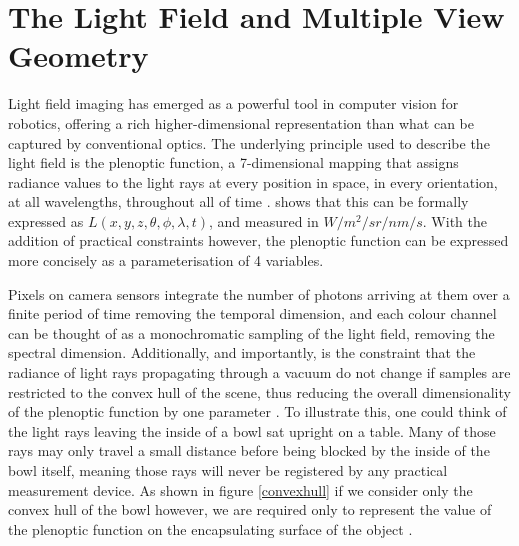 \documentclass[openany]{book}
\begin{document}
\section{The Light Field and Multiple View Geometry}

Light field imaging has emerged as a powerful tool in computer vision for robotics, offering a rich higher-dimensional representation than what can be captured by conventional optics. The underlying principle used to describe the light field is the plenoptic function, a 7-dimensional mapping that assigns radiance values to the light rays at every position in space, in every orientation, at all wavelengths, throughout all of time \cite{ihrke2016lfprinciples}. \cite{adelson1991plenoptic} shows that this can be formally expressed as $L(x,y,z,\theta, \phi, \lambda, t)$, and measured in $W/m^2/sr/nm/s$. 
With the addition of practical constraints however, the plenoptic function can be expressed more concisely as a parameterisation of 4 variables. 

Pixels on camera sensors integrate the number of photons arriving at them over a finite period of time removing the temporal dimension, and each colour channel can be thought of as a monochromatic sampling of the light field, removing the spectral dimension. Additionally, and importantly, is the constraint that the radiance of light rays propagating through a vacuum do not change if samples are restricted to the convex hull of the scene, thus reducing the overall dimensionality of the plenoptic function by one parameter \cite{levoy1996lfrendering}. To illustrate this, one could think of the light rays leaving the inside of a bowl sat upright on a table. Many of those rays may only travel a small distance before being blocked by the inside of the bowl itself, meaning those rays will never be registered by any practical measurement device. As shown in figure \ref{convexhull} if we consider only the convex hull of the bowl however, we are required only to represent the value of the plenoptic function on the encapsulating surface of the object \cite{gortler1996lumigraph}.
\end{document}
